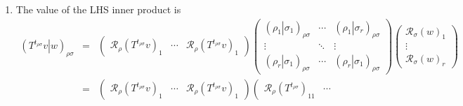 \documentclass[aps,preprint]{revtex4}
\begin{document}
\begin{enumerate}
\begin{eqnarray}
\right) \left( 
\begin{array}{ccc}
\mathcal{R}_{\sigma }\left( T\right) _{11} & \cdots & \mathcal{R}_{\sigma
}\left( T\right) _{1r} \\ 
\vdots & \ddots & \vdots \\ 
\mathcal{R}_{\sigma }\left( T\right) _{r1} & \cdots & \mathcal{R}_{\sigma
}\left( T\right) _{rr}%
\end{array}%
\right) ^{t}\left( 
\begin{array}{c}
\mathcal{R}_{\sigma }\left( w\right) _{1} \\ 
\vdots \\ 
\mathcal{R}_{\sigma }\left( w\right) _{r}%
\end{array}%
\right) .
\end{eqnarray}

\item The value of the LHS inner product is%
\begin{eqnarray}
\left( \left. T^{t_{\rho \sigma }}v\right\vert w\right) _{\rho \sigma }
&=&\left( 
\begin{array}{ccc}
\mathcal{R}_{\rho }\left( T^{t_{\rho \sigma }}v\right) _{1} & \cdots & 
\mathcal{R}_{\rho }\left( T^{t_{\rho \sigma }}v\right) _{1}%
\end{array}%
\right) \left( 
\begin{array}{ccc}
\left( \left. \rho _{1}\right\vert \sigma _{1}\right) _{\rho \sigma } & 
\cdots & \left( \left. \rho _{1}\right\vert \sigma _{r}\right) _{\rho \sigma
} \\ 
\vdots & \ddots & \vdots \\ 
\left( \left. \rho _{r}\right\vert \sigma _{1}\right) _{\rho \sigma } & 
\cdots & \left( \left. \rho _{r}\right\vert \sigma _{1}\right) _{\rho \sigma
}%
\end{array}%
\right) \left( 
\begin{array}{c}
\mathcal{R}_{\sigma }\left( w\right) _{1} \\ 
\vdots \\ 
\mathcal{R}_{\sigma }\left( w\right) _{r}%
\end{array}%
\right) \\
&=&\left( 
\begin{array}{ccc}
\mathcal{R}_{\rho }\left( T^{t_{\rho \sigma }}v\right) _{1} & \cdots & 
\mathcal{R}_{\rho }\left( T^{t_{\rho \sigma }}v\right) _{1}%
\end{array}%
\right) \left( 
\begin{array}{ccc}
\mathcal{R}_{\rho }\left( T^{t_{\rho \sigma }}\right) _{11} & \cdots & 

\end{array}
\end{eqnarray}
\end{enumerate}
\end{document}
